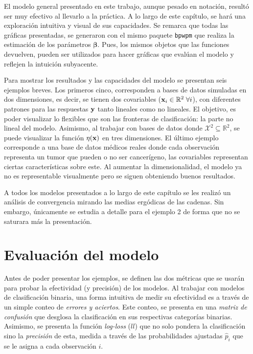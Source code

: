 \documentclass[../Main/Main.tex]{subfiles}
\begin{document}
El modelo general presentado en este trabajo, aunque pesado en notación, resultó ser muy efectivo al llevarlo a la práctica. A lo largo de este capítulo, se hará una exploración intuitiva y visual de sus capacidades. Se remarca que todas las gráficas presentadas, se generaron con el mismo paquete \verb|bpwpm| que realiza la estimación de los parámetros $\bm{\beta}$. Pues, los mismos objetos que las funciones devuelven, pueden ser utilizados para hacer gráficas que evalúan el modelo y reflejen la intuición subyacente. 

Para mostrar los resultados y las capacidades del modelo se presentan seis ejemplos breves. Los primeros cinco, corresponden a bases de datos simuladas en dos dimensiones, es decir, se tienen dos covariables ($\mathbf{x}_i\in\mathbb{R}^2 \;\forall i$),  con diferentes patrones para las respuestas $\mathbf{y}$ tanto lineales como no lineales. El objetivo, es poder visualizar lo flexibles que son las fronteras de clasificación: la parte no lineal del modelo. Asimismo, al trabajar con bases de datos donde $\mathcal{X}^2\subseteq\mathbb{R}^2$, se puede visualizar la función $\eta(\mathbf{x})$ en tres dimensiones. El último ejemplo corresponde a una base de datos médicos reales donde cada observación representa un tumor que pueden o no ser cancerígeno, las covariables representan ciertas características sobre este. Al aumentar la dimensionalidad, el modelo ya no es representable visualmente pero se siguen obteniendo buenos resultados.

A todos los modelos presentados a lo largo de este capítulo se les realizó un análisis de convergencia mirando las medias ergódicas de las cadenas. Sin embargo, únicamente se estudia a detalle para el ejemplo 2 de forma que no se saturara más la presentación. %

\section{Evaluación del modelo}
Antes de poder presentar los ejemplos, se definen las dos métricas que se usarán para probar la efectividad (y precisión) de los modelos. Al trabajar con modelos de clasificación binaria, una forma intuitiva de medir su efectividad es a través de un simple conteo de \textit{errores y aciertos}. Este conteo, se presenta en una \textit{matriz de confusión} que desglosa la clasificación en sus respectivas categorías binarias. Asimismo, se presenta la función \textit{log-loss} ($ll$) que no solo pondera la clasificación sino la \textit{precisión} de esta, medida a través de las probabilidades ajustadas $\hat{p}_i$ que se le asigna a cada observación $i$.
\end{document}
